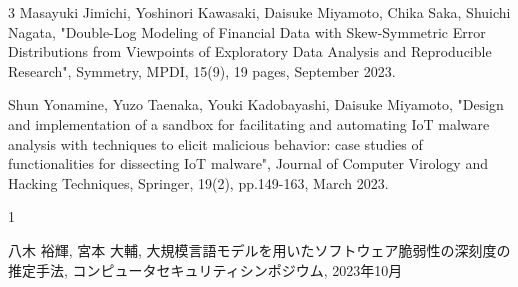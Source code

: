 \begin{雑誌論文}{3}
Masayuki Jimichi, Yoshinori Kawasaki, Daisuke Miyamoto, Chika Saka, Shuichi Nagata,
"Double-Log Modeling of Financial Data with Skew-Symmetric Error Distributions from Viewpoints of Exploratory Data Analysis and Reproducible Research",
Symmetry, MPDI, 15(9), 19 pages, September 2023. 

Shun Yonamine, Yuzo Taenaka, Youki Kadobayashi, Daisuke Miyamoto,
"Design and implementation of a sandbox for facilitating and automating IoT malware analysis with techniques to elicit malicious behavior: case studies of functionalities for dissecting IoT malware",
Journal of Computer Virology and Hacking Techniques, Springer, 19(2), pp.149-163, March 2023.

\end{雑誌論文}


\begin{発表}{1}

八木 裕輝, 宮本 大輔, 大規模言語モデルを用いたソフトウェア脆弱性の深刻度の推定手法, コンピュータセキュリティシンポジウム, 2023年10月

\end{発表}
